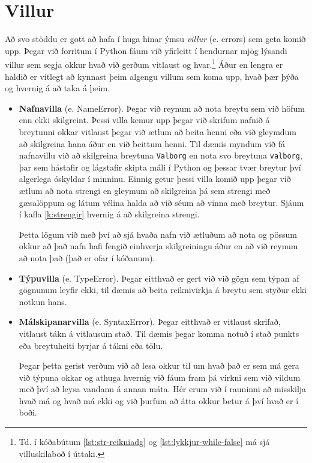 \section{Villur}\label{uk:tolur-villur}
Að svo stöddu er gott að hafa í huga hinar ýmsu \emph{villur} (e. errors) sem geta komið upp.
Þegar við forritum í Python fáum við yfirleitt í hendurnar mjög lýsandi villur sem segja okkur hvað við gerðum vitlaust og hvar.\footnote{Td. í kóðabútum \ref{lst:str-reikniadg} og \ref{lst:lykkjur-while-false} má sjá villuskilaboð í úttaki.}
Áður en lengra er haldið er vitlegt að kynnast þeim algengu villum sem koma upp, hvað þær þýða og hvernig á að taka á þeim.

\begin{itemize}[leftmargin=*]
	\item \textbf{Nafnavilla} (e. NameError).
	Þegar við reynum að nota breytu sem við höfum enn ekki skilgreint.
	Þessi villa kemur upp þegar við skrifum nafnið á breytunni okkar vitlaust þegar við ætlum að beita henni eða við gleymdum að skilgreina hana áður en við beittum henni.
	Til dæmis myndum við fá nafnavillu við að skilgreina breytuna \texttt{Valborg} en nota svo breytuna \texttt{valborg}, þar sem hástafir og lágstafir skipta máli í Python og þessar tvær breytur því algerlega óskyldar í minninu.
	Einnig getur þessi villa komið upp þegar við ætlum að nota strengi en gleymum að skilgreina þá sem strengi með gæsalöppum og látum vélina halda að við séum að vinna með breytur.
	Sjáum í kafla \ref{k:strengir} hvernig á að skilgreina strengi.
	
	Þetta lögum við með því að sjá hvaða nafn við ætluðum að nota og pössum okkur að það nafn hafi fengið einhverja skilgreiningu áður en að við reynum að nota það (það er ofar í kóðanum).
	
	\item \textbf{Týpuvilla} (e. TypeError).
	Þegar eitthvað er gert við við gögn sem týpan af gögnunum leyfir ekki,
	til dæmis að beita reiknivirkja á breytu sem styður ekki notkun hans.
	\item \textbf{Málskipanarvilla} (e. SyntaxError).
	Þegar eitthvað er vitlaust skrifað, vitlaust tákn á vitlausum stað.
	Til dæmis þegar komma notuð í stað punkts eða breytuheiti byrjar á tákni eða tölu.
	
	Þegar þetta gerist verðum við að lesa okkur til um hvað það er sem má gera við týpuna okkar og athuga hvernig við fáum fram þá virkni sem við vildum með því að leysa vandann á annan máta.
	Hér erum við í rauninni að misskilja hvað má og hvað má ekki og við þurfum að átta okkur betur á því hvað er í boði.
	

\end{itemize}
